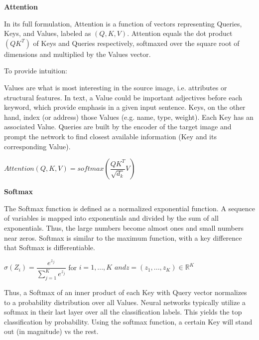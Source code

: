 \textbf{Attention}


In its full formulation, Attention is a function of vectors representing Queries, Keys, and Values, 
labeled as $(Q,K,V)$. 
Attention equals the dot product $(QK^T)$ of Keys and Queries respectively, softmaxed over 
the square root of dimensions and multiplied by the Values vector.

To provide intuition:

Values are what is most interesting in the source image, i.e. 
attributes or structural features. In text, a Value could be important adjectives before each keyword, 
which provide emphasis in a given input sentence.
Keys, on the other hand, index (or address) those Values (e.g. name, type, weight). 
Each Key has an associated Value. 
Queries are built by the encoder of the target image and prompt the network to find closest 
available information (Key and its corresponding Value). 

\begin{center}
	$ Attention(Q, K, V) = softmax(\dfrac{QK^T}{\sqrt{d_k}} V ) $
	\end{center}



\vspace{10mm}

\textbf{Softmax}


The Softmax function is defined as a normalized exponential function. 
A sequence of variables is mapped into exponentials and divided by the sum of all exponentials. 
Thus, the large numbers become almost ones and small numbers near zeros. Softmax is similar to the maximum 
function, with a key difference that Softmax is differentiable. 

\begin{center}
	$ \displaystyle\sigma(Z_i) = \dfrac{e^{z_j}}{\sum_{j=1}^K e^{z_j}}$ for $i=1,...,K$ $and z=(z_1,...,z_K) \in \mathbb{R}^K $
	\end{center}

Thus, a Softmax of an inner product of each Key with Query vector normalizes to a 
probability distribution over all Values. Neural networks typically utilize a softmax in their last 
layer over all the classification labels. This yields the top classification by probability. 
Using the softmax function, a certain Key will stand out (in magnitude) vs the rest.

\vspace{10mm}

